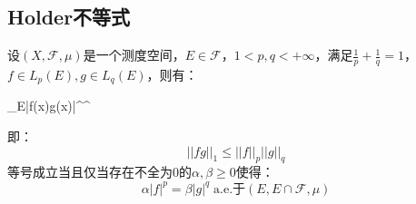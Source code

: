 \subsection{Holder不等式}
\begin{theorem}
	设$(X,\mathscr{F},\mu)$是一个测度空间，$E\in\mathscr{F}$，$1<p,q<+\infty$，满足$\frac{1}{p}+\frac{1}{q}=1$，$f\in L_p(E),g\in L_q(E)$，则有：
	\begin{inequality*}\label{ineq:Holder}
		\int_{E}|f(x)g(x)|\dif \mu\leqslant{}^{}^{}
	\end{inequality*}
	即：
	\begin{equation*}
		||fg||_1\leqslant||f||_p||g||_q
	\end{equation*}
	等号成立当且仅当存在不全为$0$的$\alpha,\beta\geqslant0$使得：
	\begin{equation*}
		\alpha|f|^p=\beta|g|^q\;\text{a.e.于$(E,E\cap\mathscr{F},\mu)$}
	\end{equation*}
\end{theorem}
